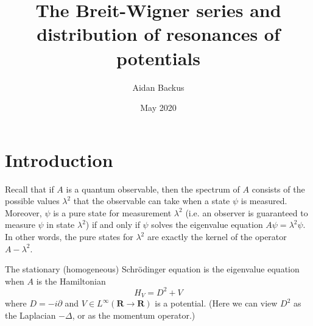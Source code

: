 \documentclass[12pt]{report}
\title{The Breit-Wigner series and distribution of resonances of potentials}
\author{Aidan Backus}
\date{May 2020}
\newcommand{\RR}{\mathbf{R}}
\theoremstyle{definition}
\begin{document}
\maketitle

\tableofcontents




\chapter{Introduction}




Recall that if $A$ is a quantum observable, then the spectrum of $A$ consists of the possible values $\lambda^2$ that the observable can take when a state $\psi$ is measured. Moreover, $\psi$ is a pure state for measurement $\lambda^2$ (i.e. an observer is guaranteed to measure $\psi$ in state $\lambda^2$) if and only if $\psi$ solves the eigenvalue equation $A\psi = \lambda^2 \psi$. In other words, the pure states for $\lambda^2$ are exactly the kernel of the operator $A - \lambda^2$.

The stationary (homogeneous) Schrödinger equation is the eigenvalue equation when $A$ is the Hamiltonian
$$H_V = D^2 + V$$
where $D = -i\partial$ and $V \in L^\infty(\RR \to \RR)$ is a potential. (Here we can view $D^2$ as the Laplacian $-\Delta$, or as the momentum operator.)
\end{document}
